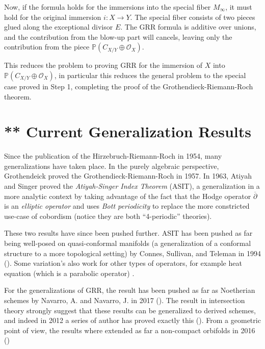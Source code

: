 \documentclass{book}
\newenvironment{Proof}[1][]
  {\begin{ProofTcb}[#1]}
  {\end{ProofTcb}}
\renewcommand{\P}{{\mathbb{P}}}
\newcommand{\CO}{{\mathcal{O}}}
\begin{document}
\begin{Proof}
  Now, if the formula holds for the immersions into the special fiber $M_\infty$, it must hold for the original
  immersion $i: X \to Y$. The special fiber consists of two pieces glued along the exceptional divisor $E$. The
  GRR formula is additive over unions, and the contribution from the blow-up part will cancels, leaving only the
  contribution from the piece $\P(C_{X/Y} \oplus \CO_X)$.

  This reduces the problem to proving GRR for the immersion of $X$ into $\P(C_{X/Y} \oplus \CO_X)$, in
  particular this reduces the general problem to the special case proved in Step 1, completing the
  proof of the Grothendieck-Riemann-Roch theorem.
\end{Proof}


\section{** Current Generalization Results}\label{sec:DRR}

Since the publication of the Hirzebruch-Riemann-Roch in 1954, many generalizations have taken place. In the
purely algebraic perspective, Grothendeick proved the Grothendieck-Riemann-Roch in 1957. In 1963, Atiyah and
Singer proved the \emph{Atiyah-Singer Index Theorem} (ASIT), a generalization in a more analytic context by taking
advantage of the fact that the Hodge operator $\overline{\partial}$ is an \emph{elliptic operator} and uses
\emph{Bott periodicity} to replace the more constricted use-case of cobordism (notice they are both
``4-periodic'' theories).

These two results have since been pushed further. ASIT has been pushed as far being well-posed on
quasi-conformal manifolds (a generalization of a conformal structure to a more topological setting) by
Connes, Sullivan, and Teleman in 1994 (\cite{connesQuasiconformalMappingsOperators1994}).  Some variation's
also work for other types of operators, for example heat equation (which is a parabolic operator)
\cite{gilkeyInvarianceTheoryHeat2018}.

For the generalizations of GRR, the result has been pushed as far as Noetherian schemes by Navarro, A. and
Navarro, J. in 2017 (\cite{navarroRiemannRochFormulaProjective2017}). The result in intersection theory
strongly suggest that these results can be generalized to derived schemes, and indeed in 2012 a series of
author has proved exactly this (\cite{lowreyGrothendieckRiemannRochDerivedSchemes2012}). From a geometric
point of view, the results where extended as far a non-compact orbifolds in 2016
(\cite{montpletRiemannRochIsometriesNoncompact2016})
\end{document}

